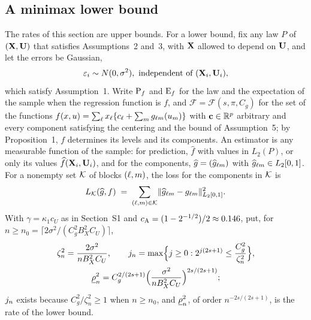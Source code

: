 

\subsection*{A minimax lower bound}

The rates of this section are upper bounds. For a lower bound, fix any law
$P$ of $(\mathbf{X},\mathbf{U})$ that satisfies Assumptions~2 and~3, with $\mathbf{X}$ allowed to
depend on $\mathbf{U}$, and let the errors be Gaussian,
\begin{equation}
  \label{eq:gauss}
  \varepsilon_i \sim N(0,\sigma^{2}),\ \text{independent of } (\mathbf{X}_i,\mathbf{U}_i),
\end{equation}
which satisfy Assumption~1. Write $\mathrm{P}_f$ and $\mathrm{E}_f$ for the law and the
expectation of the sample when the regression function is $f$, and
$\mathcal{F} = \mathcal{F}(s,\pi,C_g)$ for the set of the functions
$f(x,u) = \sum_{\ell}x_{\ell}\{c_{\ell} + \sum_{m}g_{\ell m}(u_{m})\}$
with $\mathbf{c} \in \mathbb{R}^{p}$ arbitrary and every component satisfying the centering
and the bound of Assumption~5; by Proposition~1, $f$ determines its levels and
its components. An estimator is any measurable function of the sample: for
prediction, $\widehat{f}$ with values in $L_2(P)$, or only its values
$\widehat{f}(\mathbf{X}_i,\mathbf{U}_i)$, and for the components,
$\widehat{g} = (\widehat{g}_{\ell m})$ with $\widehat{g}_{\ell m} \in
L_2[0,1]$. For a nonempty set $\mathcal{K}$ of blocks $(\ell,m)$, the loss for the
components in $\mathcal{K}$ is
\[
  L_{\mathcal{K}}(\widehat{g},f) \;=\; \sum_{(\ell,m)\in\mathcal{K}}
  \lVert\widehat{g}_{\ell m} - g_{\ell m}\rVert_{L_2[0,1]}^{2} .
\]
With $\gamma = \kappa_1c_U$ as in Section~S1 and
$c_{\mathrm{A}} = (1-2^{-1/2})/2 \approx 0.146$, put, for
$n \ge n_{0} = \lceil 2\sigma^{2}/(C_g^{2}B_X^{2}C_U)\rceil$,
\begin{equation}
  \label{eq:lower-choices}
  \begin{gathered}
  \zeta_n^{2} = \frac{2\sigma^{2}}{nB_X^{2}C_U},
  \qquad
  j_n = \max\Bigl\{j \ge 0 : 2^{j(2s+1)} \le \frac{C_g^{2}}{\zeta_n^{2}}\Bigr\},
  \\
  \underline{\rho}_{n}^{2} = C_g^{2/(2s+1)}\Bigl(\frac{\sigma^{2}}{nB_X^{2}C_U}\Bigr)^{2s/(2s+1)} ;
  \end{gathered}
\end{equation}
$j_n$ exists because $C_g^{2}/\zeta_n^{2} \ge 1$ when $n \ge n_{0}$, and
$\underline{\rho}_{n}^{2}$, of order $n^{-2s/(2s+1)}$, is the rate of the lower bound.

